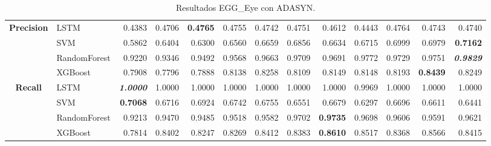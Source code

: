 \begin{table}[H]
\begin{adjustbox}{max width=14cm}
\begin{tabular}{|c|l|r|r|r|r|r|r|r|r|r|r|r|}
			\hline
			\textbf{Precision} &  LSTM &  0.4383 &  0.4706 & \textbf{  0.4765 } &  0.4755 &  0.4742 &  0.4751 &  0.4612 &  0.4443 &  0.4764 &  0.4743 &  0.4740 \\
			&  SVM &  0.5862 &  0.6404 &  0.6300 &  0.6560 &  0.6659 &  0.6856 &  0.6634 &  0.6715 &  0.6999 &  0.6979 & \textbf{  0.7162 } \\
			&  RandomForest &  0.9220 &  0.9346 &  0.9492 &  0.9568 &  0.9663 &  0.9709 &  0.9691 &  0.9772 &  0.9729 &  0.9751 & \textit{ \textbf{  0.9829 } } \\
			&  XGBoost &  0.7908 &  0.7796 &  0.7888 &  0.8138 &  0.8258 &  0.8109 &  0.8149 &  0.8148 &  0.8193 & \textbf{  0.8439 } &  0.8249 \\			
			\hline
			\textbf{Recall} &  LSTM & \textit{ \textbf{  1.0000 } } &  1.0000 &  1.0000 &  1.0000 &  1.0000 &  1.0000 &  1.0000 &  0.9969 &  1.0000 &  1.0000 &  1.0000 \\
			&  SVM & \textbf{  0.7068 } &  0.6716 &  0.6924 &  0.6742 &  0.6755 &  0.6551 &  0.6679 &  0.6297 &  0.6696 &  0.6611 &  0.6441 \\
			&  RandomForest &  0.9213 &  0.9470 &  0.9485 &  0.9518 &  0.9582 &  0.9702 & \textbf{  0.9735 } &  0.9698 &  0.9606 &  0.9591 &  0.9621 \\
			&  XGBoost &  0.7814 &  0.8402 &  0.8247 &  0.8269 &  0.8412 &  0.8383 & \textbf{  0.8610 } &  0.8517 &  0.8368 &  0.8566 &  0.8415 \\
			\hline
		\end{tabular}
	\end{adjustbox}
	\caption{Resultados EGG\_Eye con ADASYN.}
	\label{tab:EGGEyeADASYN}
\end{table}
